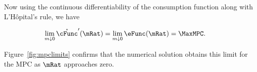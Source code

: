 \documentclass[BufferStockTheory]{subfiles}
\begin{document}
Now using the continuous differentiability of the consumption function
along with L'H\^opital's rule, we have
\begin{comment}
  \begin{align*}
    \eFunc^{\prime}(\mRat)  & = \mRat^{-1} \mathring{\cFunc}^{\prime}(\mRat) - \mRat^{-2} \mathring{\cFunc}(\mRat)
    \\ \mRat \eFunc^{\prime}(\mRat)  & = \mathring{\cFunc}^{\prime}(\mRat) - \mathring{\cFunc}(\mRat)/\mRat
    \\ \mathring{\cFunc}^{\prime}(\mRat)  & = \eFunc(\mRat)+ \mRat \eFunc^{\prime}(\mRat)
  \end{align*}
  and since $0<\eFunc(\mRat)<1$ we have
\end{comment}
\begin{align*}
  \lim_{m \downarrow 0} \mathring{\cFunc}^{\prime}(\mRat)  & = \lim_{m \downarrow 0}
                                                  \eFunc(\mRat) = \MaxMPC. 
\end{align*}

Figure~\ref{fig:mpclimits} confirms that the numerical solution obtains this limit for the MPC as $\mRat$ approaches zero.
\end{document}
